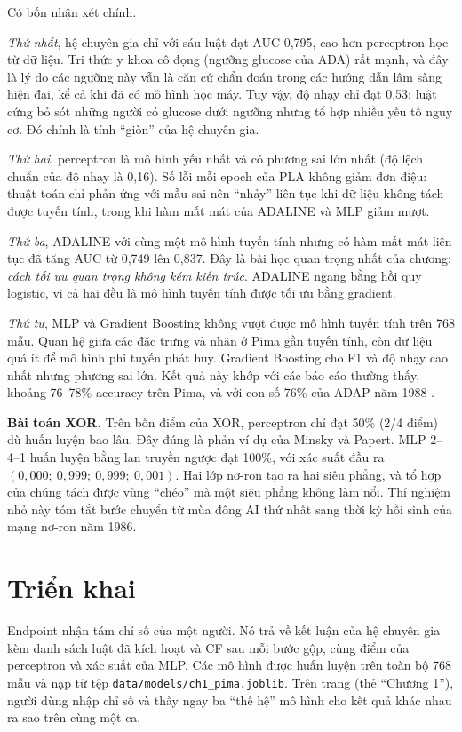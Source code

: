 

Có bốn nhận xét chính.

\emph{Thứ nhất}, hệ chuyên gia chỉ với sáu luật đạt AUC 0,795, cao hơn perceptron học từ dữ liệu. Tri thức y khoa cô đọng (ngưỡng glucose của ADA) rất mạnh, và đây là lý do các ngưỡng này vẫn là căn cứ chẩn đoán trong các hướng dẫn lâm sàng hiện đại, kể cả khi đã có mô hình học máy. Tuy vậy, độ nhạy chỉ đạt 0,53: luật cứng bỏ sót những người có glucose dưới ngưỡng nhưng tổ hợp nhiều yếu tố nguy cơ. Đó chính là tính ``giòn'' của hệ chuyên gia.

\emph{Thứ hai}, perceptron là mô hình yếu nhất và có phương sai lớn nhất (độ lệch chuẩn của độ nhạy là 0,16). Số lỗi mỗi epoch của PLA không giảm đơn điệu: thuật toán chỉ phản ứng với mẫu sai nên ``nhảy'' liên tục khi dữ liệu không tách được tuyến tính, trong khi hàm mất mát của ADALINE và MLP giảm mượt.

\emph{Thứ ba}, ADALINE với cùng một mô hình tuyến tính nhưng có hàm mất mát liên tục đã tăng AUC từ 0,749 lên 0,837. Đây là bài học quan trọng nhất của chương: \emph{cách tối ưu quan trọng không kém kiến trúc}. ADALINE ngang bằng hồi quy logistic, vì cả hai đều là mô hình tuyến tính được tối ưu bằng gradient.

\emph{Thứ tư}, MLP và Gradient Boosting không vượt được mô hình tuyến tính trên 768 mẫu. Quan hệ giữa các đặc trưng và nhãn ở Pima gần tuyến tính, còn dữ liệu quá ít để mô hình phi tuyến phát huy. Gradient Boosting cho F1 và độ nhạy cao nhất nhưng phương sai lớn. Kết quả này khớp với các báo cáo thường thấy, khoảng 76–78\% accuracy trên Pima, và với con số 76\% của ADAP năm 1988 \cite{smith1988}.


\textbf{Bài toán XOR.} Trên bốn điểm của XOR, perceptron chỉ đạt 50\% (2/4 điểm) dù huấn luyện bao lâu. Đây đúng là phản ví dụ của Minsky và Papert. MLP 2–4–1 huấn luyện bằng lan truyền ngược đạt 100\%, với xác suất đầu ra $(0{,}000;\ 0{,}999;\ 0{,}999;\ 0{,}001)$. Hai lớp nơ-ron tạo ra hai siêu phẳng, và tổ hợp của chúng tách được vùng ``chéo'' mà một siêu phẳng không làm nổi. Thí nghiệm nhỏ này tóm tắt bước chuyển từ mùa đông AI thứ nhất sang thời kỳ hồi sinh của mạng nơ-ron năm 1986.

\section{Triển khai}

Endpoint  nhận tám chỉ số của một người. Nó trả về kết luận của hệ chuyên gia kèm danh sách luật đã kích hoạt và CF sau mỗi bước gộp, cùng điểm của perceptron và xác suất của MLP. Các mô hình được huấn luyện trên toàn bộ 768 mẫu và nạp từ tệp \texttt{data/models/ch1\_pima.joblib}. Trên trang  (thẻ ``Chương 1''), người dùng nhập chỉ số và thấy ngay ba ``thế hệ'' mô hình cho kết quả khác nhau ra sao trên cùng một ca.

